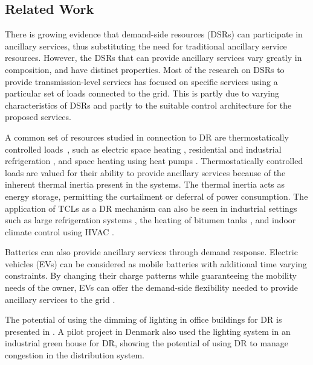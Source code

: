 
\subsection{Related Work}
There is growing evidence that demand-side resources (DSRs) can participate in ancillary services, thus substituting the need for traditional ancillary service resources. However, the DSRs that can provide ancillary services vary greatly in composition, and have distinct properties. Most of the research on DSRs to provide transmission-level services has focused on specific services using a particular set of loads connected to the grid. This is partly due to varying characteristics of DSRs and partly to the suitable control architecture for the proposed services. 

A common set of resources studied in connection to DR are thermostatically controlled loads~\cite{Molina_Garcia_2011,Kara_2012,thavlov2014utilization,mathieu2012using}, such as electric space heating \cite{mathieu2012using,thavlov2014utilization}, residential and industrial refrigeration \cite{lakshmanan2014energy}, and space heating using heat pumps \cite{halvgaard2012economic}. Thermostatically controlled loads are valued for their ability to provide ancillary services because of the inherent thermal inertia present in the systems. The thermal inertia acts as energy storage, permitting the curtailment or deferral of power consumption. The application of TCLs as a DR mechanism can also be seen in industrial settings such as large refrigeration systems \cite{rahnama2013integration}, the heating of bitumen tanks \cite{cheng2014availability}, and indoor climate control using HVAC \cite{blum2013ancillary}. 

Batteries can also provide ancillary services through demand response. Electric vehicles (EVs) can be considered as mobile batteries with additional time varying constraints. By changing their charge patterns while guaranteeing the mobility needs of the owner, EVs can offer the demand-side flexibility needed to provide ancillary services to the grid \cite{zarogiannis2014dynamic,kara2015estimating}. 

The potential of using the dimming of lighting in office buildings for DR is presented in \cite{rubinstein2011demand}. A pilot project in Denmark also used the lighting system in an industrial green house for DR, showing the potential of using DR to manage congestion in the distribution system. 

